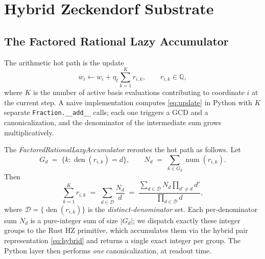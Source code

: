 \documentclass[11pt,a4paper]{article}
\begin{document}
\section{Hybrid Zeckendorf Substrate}
\label{sec:hz}

\subsection{The Factored Rational Lazy Accumulator}

The arithmetic hot path is the update
\begin{equation}
w_{i} \leftarrow w_{i} + \eta_{t} \sum_{k=1}^{K} r_{i,k}, \qquad r_{i,k} \in \mathbb{Q},
\label{eq:update}
\end{equation}
where $K$ is the number of active basis evaluations contributing to
coordinate $i$ at the current step. A naive implementation computes
\eqref{eq:update} in Python with $K$ separate
\texttt{Fraction.\_\_add\_\_} calls; each one triggers a GCD and a
canonicalization, and the denominator of the intermediate sum grows
multiplicatively.

The \emph{FactoredRationalLazyAccumulator} reroutes the hot path as follows.
Let
\[
G_{d} \;=\; \bigl\{k : \operatorname{den}(r_{i,k}) = d\bigr\}, \qquad
N_{d} \;=\; \sum_{k \in G_{d}} \operatorname{num}(r_{i,k}).
\]
Then
\begin{equation}
\sum_{k=1}^{K} r_{i,k} \;=\; \sum_{d \in \mathcal{D}} \frac{N_{d}}{d}
\;=\; \frac{\sum_{d \in \mathcal{D}} N_{d} \prod_{d' \neq d} d'}{\prod_{d \in \mathcal{D}} d},
\label{eq:factored}
\end{equation}
where $\mathcal{D} = \{\operatorname{den}(r_{i,k})\}$ is the
\emph{distinct-denominator} set. Each per-denominator sum $N_{d}$ is a
pure-integer sum of size $|G_{d}|$; we dispatch exactly these integer
groups to the Rust HZ primitive, which accumulates them via the hybrid
pair representation \eqref{eq:hybrid} and returns a single exact
integer per group. The Python layer then performs \emph{one}
canonicalization, at readout time.
\end{document}
